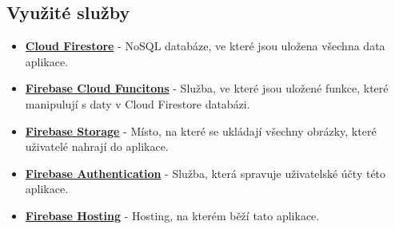 \documentclass[a4paper,12pt]{article}
\begin{document}
\subsection{Využité služby}
\begin{itemize}
\item
  \textbf{\href{https://cloud.google.com/firestore}{Cloud Firestore}} - NoSQL
  databáze, ve které jsou uložena všechna data aplikace.
\item
  \textbf{\href{https://firebase.google.com/docs/functions}{Firebase Cloud
  Funcitons}} - Služba, ve které jsou uložené funkce, které manipulují s
  daty v Cloud Firestore databázi.
\item
  \textbf{\href{https://firebase.google.com/docs/storage}{Firebase Storage}} -
  Místo, na které se ukládají všechny obrázky, které uživatelé nahrají
  do aplikace.
\item
  \textbf{\href{https://firebase.google.com/docs/auth}{Firebase Authentication}}
  - Služba, která spravuje uživatelské účty této aplikace.
\item
  \textbf{\href{https://firebase.google.com/docs/hosting}{Firebase Hosting}} -
  Hosting, na kterém běží tato aplikace.
\end{itemize}
\end{document}
